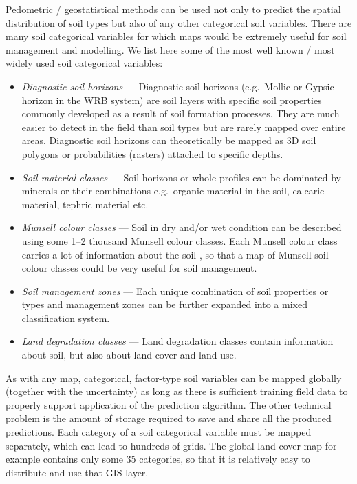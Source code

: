 \documentclass[graybox,natbib,nospthms,UStrade]{svmono}
\begin{document}
Pedometric / geostatistical methods can be used not only to predict the
spatial distribution of soil types but also of any other categorical soil
variables. There are many soil categorical variables for which maps
would be extremely useful for soil management and modelling. We list
here some of the most well known / most widely used soil categorical
variables:

\begin{itemize}
\item
  \emph{Diagnostic soil horizons} --- Diagnostic soil horizons (e.g.~Mollic
  or Gypsic horizon in the WRB system) are soil layers with specific
  soil properties commonly developed as a result of soil
  formation processes. They are much easier to detect in the field
  than soil types but are rarely mapped over entire areas. Diagnostic
  soil horizons can theoretically be mapped as 3D soil polygons or
  probabilities (rasters) attached to specific depths.
\item
  \emph{Soil material classes} --- Soil horizons or whole profiles can be
  dominated by minerals or their combinations e.g.~organic material in
  the soil, calcaric material, tephric material etc.
\item
  \emph{Munsell colour classes} --- Soil in dry and/or wet condition can be
  described using some 1--2 thousand Munsell colour classes. Each
  Munsell colour class carries a lot of information about the soil
  \citep{fernandez1988color}, so that a map of Munsell soil colour classes
  could be very useful for soil management.
\item
  \emph{Soil management zones} --- Each unique combination of soil properties
  or types and management zones can be further expanded into a mixed
  classification system.
\item
  \emph{Land degradation classes} --- Land degradation classes contain
  information about soil, but also about land cover and land use.
\end{itemize}

As with any map, categorical, factor-type soil variables can be mapped
globally (together with the uncertainty) as long as there is sufficient
training field data to properly support application of the prediction
algorithm. The other technical problem is the amount of storage required to save and
share all the produced predictions. Each category of a soil categorical
variable must be mapped separately, which can lead to hundreds of grids.
The global land cover map for example contains only some 35 categories,
so that it is relatively easy to distribute and use that GIS layer.
\end{document}
